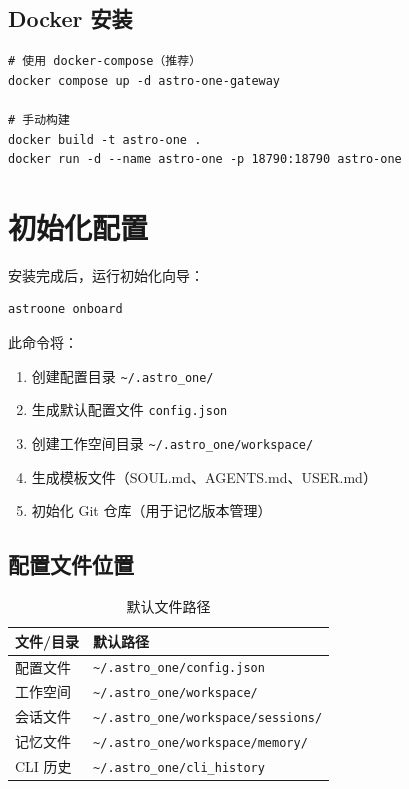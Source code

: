 \documentclass[12pt,a4paper,UTF8]{ctexart}
\begin{document}
\subsection{Docker 安装}

\begin{verbatim}
# 使用 docker-compose（推荐）
docker compose up -d astro-one-gateway

# 手动构建
docker build -t astro-one .
docker run -d --name astro-one -p 18790:18790 astro-one
\end{verbatim}

\section{初始化配置}

安装完成后，运行初始化向导：

\begin{verbatim}
astroone onboard
\end{verbatim}

此命令将：
\begin{enumerate}
    \item 创建配置目录 \texttt{\textasciitilde/.astro\_one/}
    \item 生成默认配置文件 \texttt{config.json}
    \item 创建工作空间目录 \texttt{\textasciitilde/.astro\_one/workspace/}
    \item 生成模板文件（SOUL.md、AGENTS.md、USER.md）
    \item 初始化 Git 仓库（用于记忆版本管理）
\end{enumerate}

\subsection{配置文件位置}

\begin{table}[H]
\centering
\begin{tabular}{L{5cm} L{10cm}}
\toprule
\textbf{文件/目录} & \textbf{默认路径} \\
\midrule
配置文件 & \texttt{\textasciitilde/.astro\_one/config.json} \\
工作空间 & \texttt{\textasciitilde/.astro\_one/workspace/} \\
会话文件 & \texttt{\textasciitilde/.astro\_one/workspace/sessions/} \\
记忆文件 & \texttt{\textasciitilde/.astro\_one/workspace/memory/} \\
CLI 历史 & \texttt{\textasciitilde/.astro\_one/cli\_history} \\
\bottomrule
\end{tabular}
\caption{默认文件路径}
\end{table}
\end{document}
